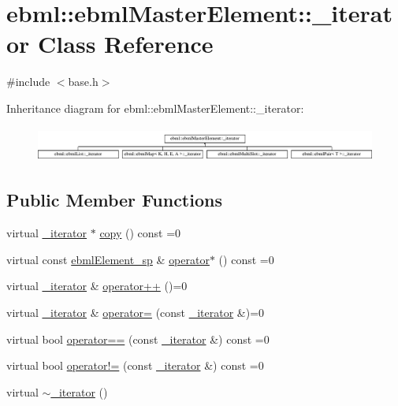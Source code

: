 \hypertarget{classebml_1_1ebmlMasterElement_1_1__iterator}{}\section{ebml\+:\+:ebml\+Master\+Element\+:\+:\+\_\+iterator Class Reference}
\label{classebml_1_1ebmlMasterElement_1_1__iterator}


{\ttfamily \#include $<$base.\+h$>$}

Inheritance diagram for ebml\+:\+:ebml\+Master\+Element\+:\+:\+\_\+iterator\+:\begin{figure}[H]
\begin{center}
\leavevmode
\includegraphics[height=1.161826cm]{classebml_1_1ebmlMasterElement_1_1__iterator}
\end{center}
\end{figure}
\subsection*{Public Member Functions}
\begin{DoxyCompactItemize}
\item 
virtual \mbox{\hyperlink{classebml_1_1ebmlMasterElement_1_1__iterator}{\+\_\+iterator}} $\ast$ \mbox{\hyperlink{classebml_1_1ebmlMasterElement_1_1__iterator_af9f522b6d6f34acb410add9579a35c13}{copy}} () const =0
\item 
virtual const \mbox{\hyperlink{namespaceebml_adad533b7705a16bb360fe56380c5e7be}{ebml\+Element\+\_\+sp}} \& \mbox{\hyperlink{classebml_1_1ebmlMasterElement_1_1__iterator_a3275ab5cdba37d79dd323879598f4f5d}{operator$\ast$}} () const =0
\item 
virtual \mbox{\hyperlink{classebml_1_1ebmlMasterElement_1_1__iterator}{\+\_\+iterator}} \& \mbox{\hyperlink{classebml_1_1ebmlMasterElement_1_1__iterator_ab77210fd0e481e1bb5b8563f7bd8142b}{operator++}} ()=0
\item 
virtual \mbox{\hyperlink{classebml_1_1ebmlMasterElement_1_1__iterator}{\+\_\+iterator}} \& \mbox{\hyperlink{classebml_1_1ebmlMasterElement_1_1__iterator_a849c5027957fa1a022de0417aea1ad9e}{operator=}} (const \mbox{\hyperlink{classebml_1_1ebmlMasterElement_1_1__iterator}{\+\_\+iterator}} \&)=0
\item 
virtual bool \mbox{\hyperlink{classebml_1_1ebmlMasterElement_1_1__iterator_ab0b53665f686e2ae379b275110ea3c95}{operator==}} (const \mbox{\hyperlink{classebml_1_1ebmlMasterElement_1_1__iterator}{\+\_\+iterator}} \&) const =0
\item 
virtual bool \mbox{\hyperlink{classebml_1_1ebmlMasterElement_1_1__iterator_aef9e45972d70a546942f9de73af40dc2}{operator!=}} (const \mbox{\hyperlink{classebml_1_1ebmlMasterElement_1_1__iterator}{\+\_\+iterator}} \&) const =0
\item 
virtual \mbox{\hyperlink{classebml_1_1ebmlMasterElement_1_1__iterator_a499f5fe9a5dddf51dd0ca181fc98f561}{$\sim$\+\_\+iterator}} ()
\end{DoxyCompactItemize}
